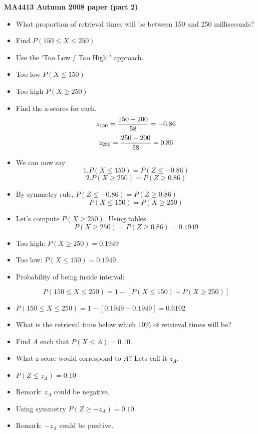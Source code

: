 
{
	\noindent \textbf{MA4413 Autumn 2008 paper (part 2)}
	\begin{itemize}
		\item What proportion of retrieval times will be between 150 and 250 milliseconds?
		\item Find $P(150 \leq X \leq 250)$
		\item Use the `Too Low / Too High ' approach.
		\item Too low $P( X \leq 150)$
		\item Too high $P( X \geq 250)$
		\item Find the z-scores for each.
		\[ z_{150} =  {150 - 200 \over 58}  = -0.86 \]
		\[ z_{250} =  {250 - 200 \over 58}  = 0.86 \]
	\end{itemize}
	\begin{itemize}
		\item We can now say
		\[ 1. P( X \leq 150) = P( Z \leq -0.86)\]
		\[ 2. P( X \geq 250) = P( Z \geq 0.86)\]
		\item By symmetry rule, $P( Z \leq -0.86) = P( Z \geq 0.86)$
		\[ P( X \leq 150) =  P( X \geq 250) \]
		\item Let's compute $P( X \geq 250)$. Using tables
		\[P( X \geq 250) = P( Z \geq 0.86) = 0.1949 \]
	\end{itemize}
	\begin{itemize}
		\item Too high: $P( X \geq 250) = 0.1949 $
		\item Too low:  $P( X \leq 150) = 0.1949 $
		\item Probability of being inside interval:
		
		\[ P(150 \leq X \leq 250) = 1- [ P( X \leq 150) + P( X \geq 250)] \]
		
		\item $P(150 \leq X \leq 250) = 1- [ 0.1949 + 0.1949 ] = \boldsymbol{0.6102}$
		
	\end{itemize}
\begin{itemize}
		\item What is the retrieval time below which 10\% of retrieval times will be?
		\item Find $A$ such that $P(X \leq A) = 0.10$.
		\item What z-score would correspond to $A$? Lets call it $z_A$.
		\item $P(Z  \leq z_A) = 0.10$
		\item Remark: $z_A$ could be negative.
		\item Using symmetry $P(Z \geq -z_A) = 0.10$
		\item Remark: $-z_A$ could be positive.
	\end{itemize}
}


